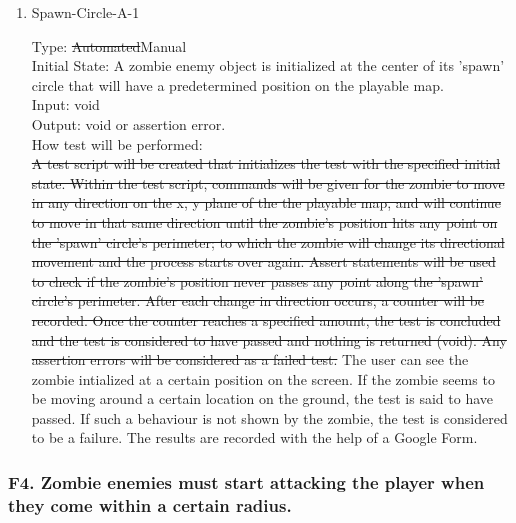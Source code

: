 \documentclass[12pt, titlepage]{article}
\DeclareRobustCommand{\hsout}[1]{\texorpdfstring{\sout{#1}}{#1}}
\newcounter{ftnum}
\begin{document}
\begin{enumerate}

\item{Spawn-Circle-A-1\\}   \label{F3-1}

Type: \hsout{Automated}{\color{magenta}Manual}\\
					
Initial State: A zombie enemy object is initialized at the center of its 'spawn' circle that will have a predetermined position on the playable map.\\
					
Input: void \\
					
Output: void or assertion error.\\
					
How test will be performed:\\ \hsout{A test script will be created that initializes the test with the specified initial state. Within the test script, commands will be given for the zombie to move in any direction on the x, y plane of the the playable map, and will continue to move in that same direction until the zombie's position hits any point on the 'spawn' circle's perimeter; to which the zombie will change its directional movement and the process starts over again. Assert statements will be used to check if the zombie's position never passes any point along the 'spawn' circle's perimeter. After each change in direction occurs, a counter will be recorded. Once the counter reaches a specified amount, the test is concluded and the test is considered to have passed and nothing is returned (void). Any assertion errors will be considered as a failed test.}
{\color{magenta}The user can see the zombie intialized at a certain position on the screen. If the zombie seems to be moving around a certain location on the ground, the test is said to have passed. If such a behaviour is not shown by the zombie, the test is considered to be a failure. The results are recorded with the help of a Google Form.} \\

\end{enumerate}

\subsubsection{{\color{magenta} F4.} Zombie enemies must start attacking the player when they come within a certain radius.}
		
\end{document}
